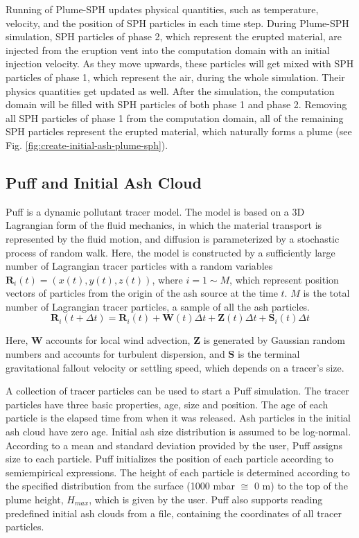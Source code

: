 \documentclass[utf8]{frontiersSCNS} %
\begin{document}
Running of Plume-SPH updates physical quantities, such as temperature, velocity, and the position of SPH particles in each time step. During Plume-SPH simulation, SPH particles of phase 2, which represent the erupted material, are injected from the eruption vent into the computation domain with an initial injection velocity. As they move upwards, these particles will get mixed with SPH particles of phase 1, which represent the air, during the whole simulation. Their physics quantities get updated as well. After the simulation, the computation domain will be filled with SPH particles of both phase 1 and phase 2. Removing all SPH particles of phase 1 from the computation domain, all of the remaining SPH particles  represent the erupted material, which naturally forms a plume (see  Fig. \ref{fig:create-initial-ash-plume-sph}). 

\subsection{Puff and Initial Ash Cloud} \label{sec:puff-model}
Puff \citep{tanaka1991development,searcy1998puff} is a dynamic pollutant tracer model. The model is based on a 3D Lagrangian form of the fluid mechanics, in which the material transport is represented by the fluid motion, and diffusion is parameterized by a stochastic process of random walk. Here, the model is constructed by a sufficiently large number of  Lagrangian tracer particles with a random variables $\textbf{R}_i(t) = (x(t),y(t),z(t))$, where $ i = \mbox{1} \sim M$, which represent position vectors of particles from the origin of the ash source at the time $t$. $M$ is the total number of  Lagrangian tracer particles, a sample of all the ash particles.
\begin{equation}
\textbf{R}_i(t+\Delta t) = \textbf{R}_i(t) + \textbf{W}(t)\Delta t + \textbf{Z}(t)\Delta t + \textbf{S}_i(t) \Delta t
\label{eq:puff-model}
\end{equation}

Here, $\textbf{W}$ accounts for local wind advection, $\textbf{Z}$  is generated by Gaussian random numbers and accounts for turbulent dispersion, and $\textbf{S}$ is the terminal gravitational fallout velocity or settling speed, which depends on a tracer's size.

A collection of tracer particles can be used to start a Puff simulation. The tracer particles have three basic properties, age, size and position. The age of each particle is the elapsed time from when it was released. Ash particles in the initial ash cloud have zero age. Initial ash size distribution is assumed to be log-normal. According to a mean and standard deviation provided by the user, Puff assigns size to each particle. Puff initializes the position of each particle according to semiempirical expressions. The height of each particle is determined according to the specified distribution from the surface (1000 mbar $\cong$ 0 m) to the top of the plume height, $H_{max}$, which is given by the user. Puff also supports reading predefined initial ash clouds from a file, containing the coordinates of all tracer particles. 
\end{document}
